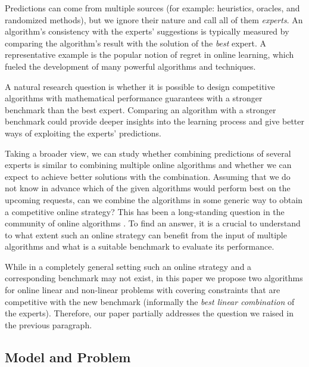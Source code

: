 Predictions can come from multiple sources (for example: heuristics, oracles, and randomized methods), but we ignore their nature and call all of them \emph{experts}.  An algorithm's consistency with the experts' suggestions is typically measured by comparing the algorithm's result with the solution of the \emph{best} expert. A representative example is the popular notion of regret in online learning, which fueled the development of many powerful algorithms and techniques.

A natural research question is whether it is possible to design competitive algorithms with mathematical performance guarantees with a stronger benchmark than the best expert. Comparing an algorithm with a stronger benchmark could provide deeper insights into the learning process and give better ways of exploiting the experts' predictions.

Taking a broader view, we can study whether combining predictions of several experts is similar to combining multiple online algorithms and whether we can expect to achieve better solutions with the combination. Assuming that we do not know in advance which of the given algorithms would perform best on the upcoming requests, can we combine the algorithms in some generic way to obtain a competitive online strategy? This has been a long-standing question in the community of online algorithms \cite{AzarBroder93:On-line-Choice,BlumBurch00:On-line-Learning}. To find an answer, it is a crucial to understand to what extent such an online strategy can benefit from the input of multiple algorithms and what is a suitable benchmark to evaluate its performance.

While in a completely general setting such an online strategy and a corresponding benchmark may not exist, in this paper we propose
two algorithms for online linear and non-linear problems with covering constraints that are competitive with the new benchmark (informally the \emph{best linear combination} of the experts). Therefore, our paper partially addresses the question we raised in the previous paragraph.

\subsection{Model and Problem}

